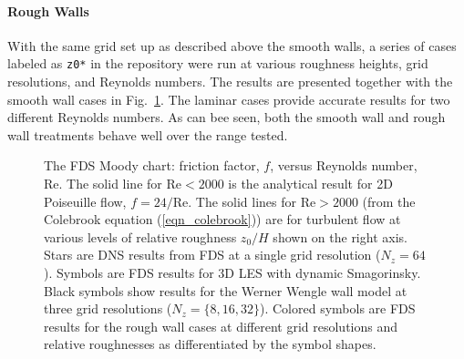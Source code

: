 \documentclass[11pt]{book}
\begin{document}
\paragraph{Rough Walls}

With the same grid set up as described above the smooth walls, a series of cases labeled as {\tt z0*} in the repository were run at various roughness heights, grid resolutions, and Reynolds numbers.  The results are presented together with the smooth wall cases in Fig.~\ref{fig_fds_moody_chart}.  The laminar cases provide accurate results for two different Reynolds numbers.  As can bee seen, both the smooth wall and rough wall treatments behave well over the range tested.
\begin{figure}
   \begin{center}
      \caption[FDS Moody chart]{\label{fig_fds_moody_chart} The FDS Moody chart: friction factor, $f$, versus Reynolds number, Re. The solid line for $\mbox{Re} < 2000$ is the analytical result for 2D Poiseuille flow, $f=24/\mbox{Re}$. The solid lines for $\mbox{Re}>2000$ (from the Colebrook equation (\ref{eqn_colebrook})) are for turbulent flow at various levels of relative roughness $z_0/H$ shown on the right axis.  Stars are DNS results from FDS at a single grid resolution ($N_z=64$). Symbols are FDS results for 3D LES with dynamic Smagorinsky.  Black symbols show results for the Werner Wengle wall model at three grid resolutions ($N_z=\{8,16,32\}$).  Colored symbols are FDS results for the rough wall cases at different grid resolutions and relative roughnesses as differentiated by the symbol shapes.}
   \end{center}
\end{figure}
\end{document}
